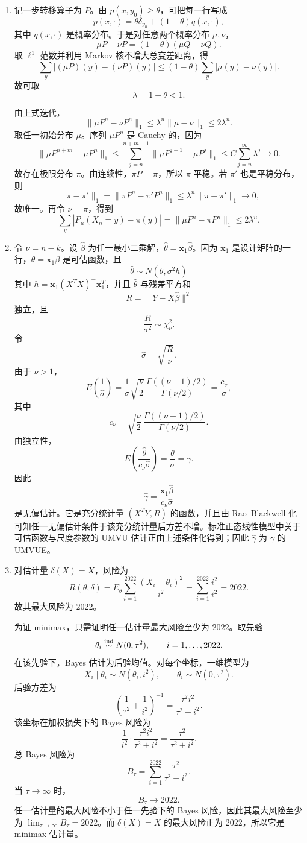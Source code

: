 \documentclass[UTF8,12pt]{ctexart}
\begin{document}
\begin{enumerate}[label=\textbf{\arabic*.},leftmargin=2.2em]
\item 记一步转移算子为 \(P\)。由 \(p(x,y_0)\ge\theta\)，可把每一行写成
\[
p(x,\cdot)=\theta\delta_{y_0}+(1-\theta)q(x,\cdot),
\]
其中 \(q(x,\cdot)\) 是概率分布。于是对任意两个概率分布 \(\mu,\nu\)，
\[
\mu P-\nu P=(1-\theta)(\mu Q-\nu Q).
\]
取 \(\ell^1\) 范数并利用 Markov 核不增大总变差距离，得
\[
\sum_y|(\mu P)(y)-(\nu P)(y)|
\le (1-\theta)\sum_y|\mu(y)-\nu(y)|.
\]
故可取
\[
\lambda=1-\theta<1.
\]

由上式迭代，
\[
\|\mu P^n-\nu P^n\|_1\le \lambda^n\|\mu-\nu\|_1\le2\lambda^n.
\]
取任一初始分布 \(\mu\)。序列 \(\mu P^n\) 是 Cauchy 的，因为
\[
\|\mu P^{n+m}-\mu P^n\|_1
\le \sum_{j=n}^{n+m-1}\|\mu P^{j+1}-\mu P^j\|_1
\le C\sum_{j=n}^{\infty}\lambda^j\to0.
\]
故存在极限分布 \(\pi\)。由连续性，\(\pi P=\pi\)，所以 \(\pi\) 平稳。若 \(\pi'\) 也是平稳分布，则
\[
\|\pi-\pi'\|_1=\|\pi P^n-\pi'P^n\|_1\le\lambda^n\|\pi-\pi'\|_1\to0,
\]
故唯一。再令 \(\nu=\pi\)，得到
\[
\sum_y|P_\mu(X_n=y)-\pi(y)|=\|\mu P^n-\pi P^n\|_1\le2\lambda^n.
\]

\item 令 \(\nu=n-k\)。设 \(\hat\beta\) 为任一最小二乘解，\(\hat\theta=\mathbf x_1\hat\beta\)。因为 \(\mathbf x_1\) 是设计矩阵的一行，\(\theta=\mathbf x_1\beta\) 是可估函数，且
\[
\hat\theta\sim N(\theta,\sigma^2 h)
\]
其中 \(h=\mathbf x_1(X^TX)^-\mathbf x_1^T\)，并且 \(\hat\theta\) 与残差平方和
\[
R=\|Y-X\hat\beta\|^2
\]
独立，且
\[
\frac{R}{\sigma^2}\sim\chi^2_\nu.
\]
令
\[
\hat\sigma=\sqrt{\frac{R}{\nu}}.
\]
由于 \(\nu>1\)，
\[
E\left(\frac1{\hat\sigma}\right)
=\frac1{\sigma}\sqrt{\frac{\nu}{2}}\,
\frac{\Gamma((\nu-1)/2)}{\Gamma(\nu/2)}
=\frac{c_\nu}{\sigma},
\]
其中
\[
c_\nu=\sqrt{\frac{\nu}{2}}\,
\frac{\Gamma((\nu-1)/2)}{\Gamma(\nu/2)}.
\]
由独立性，
\[
E\left(\frac{\hat\theta}{c_\nu\hat\sigma}\right)
=\frac{\theta}{\sigma}=\gamma.
\]
因此
\[
\hat\gamma=\frac{\mathbf x_1\hat\beta}{c_\nu\hat\sigma}
\]
是无偏估计。它是充分统计量 \((X^TY,R)\) 的函数，并且由 Rao--Blackwell 化可知任一无偏估计条件于该充分统计量后方差不增。标准正态线性模型中关于可估函数与尺度参数的 UMVU 估计正由上述条件化得到；因此 \(\hat\gamma\) 为 \(\gamma\) 的 UMVUE。

\item 对估计量 \(\delta(X)=X\)，风险为
\[
R(\theta,\delta)=E_\theta\sum_{i=1}^{2022}\frac{(X_i-\theta_i)^2}{i^2}
=\sum_{i=1}^{2022}\frac{i^2}{i^2}=2022.
\]
故其最大风险为 \(2022\)。

为证 minimax，只需证明任一估计量最大风险至少为 \(2022\)。取先验
\[
\theta_i\stackrel{\rm ind}{\sim}N(0,\tau^2),\qquad i=1,\ldots,2022.
\]
在该先验下，Bayes 估计为后验均值。对每个坐标，一维模型为
\[
X_i\mid\theta_i\sim N(\theta_i,i^2),\qquad \theta_i\sim N(0,\tau^2).
\]
后验方差为
\[
\left(\frac1{\tau^2}+\frac1{i^2}\right)^{-1}
=\frac{\tau^2 i^2}{\tau^2+i^2}.
\]
该坐标在加权损失下的 Bayes 风险为
\[
\frac1{i^2}\cdot \frac{\tau^2 i^2}{\tau^2+i^2}
=\frac{\tau^2}{\tau^2+i^2}.
\]
总 Bayes 风险为
\[
B_\tau=\sum_{i=1}^{2022}\frac{\tau^2}{\tau^2+i^2}.
\]
当 \(\tau\to\infty\) 时，
\[
B_\tau\to2022.
\]
任一估计量的最大风险不小于任一先验下的 Bayes 风险，因此其最大风险至少为 \(\lim_{\tau\to\infty}B_\tau=2022\)。而 \(\delta(X)=X\) 的最大风险正为 \(2022\)，所以它是 minimax 估计量。
\end{enumerate}
\end{document}
